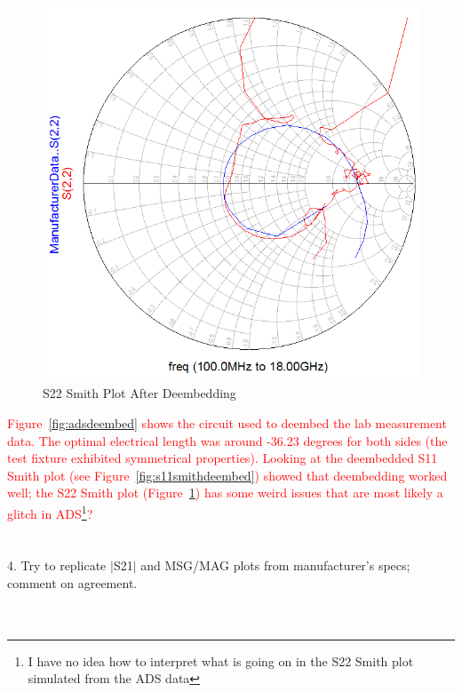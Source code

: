 \documentclass[conference]{IEEEtran}
\begin{document}
\begin{figure}[!h]
\centering
\includegraphics[scale=0.3]{pics/S22SmithDeembed.png}
\caption{S22 Smith Plot After Deembedding}
\label{fig:s22smithdeembed}
\end{figure}

\textcolor{red}{Figure~\ref{fig:adsdeembed} shows the circuit used to deembed the lab measurement data.  The optimal electrical length was around -36.23 degrees for both sides (the test fixture exhibited symmetrical properties).  Looking at the deembedded S11 Smith plot (see Figure~\ref{fig:s11smithdeembed}) showed that deembedding worked well; the S22 Smith plot (Figure~\ref{fig:s22smithdeembed}) has some weird issues that are most likely a glitch in ADS\footnote{I have no idea how to interpret what is going on in the S22 Smith plot simulated from the ADS data}?}
\\\\\\
4. Try to replicate $|$S21$|$ and MSG/MAG plots from manufacturer’s specs; comment on agreement.\\\\\\
\end{document}
